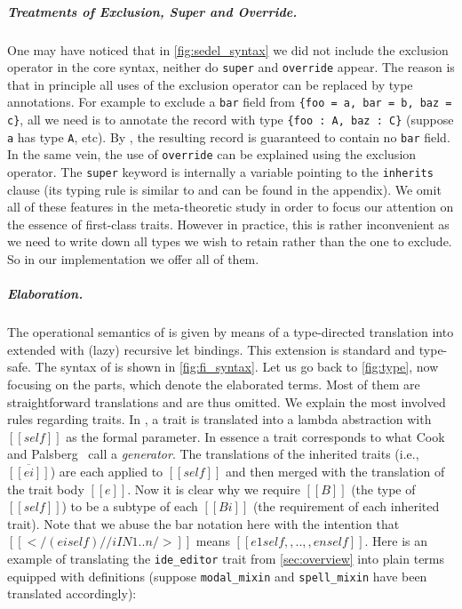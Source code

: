 \subparagraph{Treatments of Exclusion, Super and Override.}
One may have noticed that in \cref{fig:sedel_syntax} we did not include the
exclusion operator in the core \name syntax, neither do \lstinline{super} and
\lstinline{override} appear. The reason is that in principle all
uses of the exclusion operator can be replaced by type annotations. For example
to exclude a \lstinline{bar} field from \lstinline${foo = a, bar = b, baz = c}$,
all we need is to annotate the record with type \lstinline${foo : A, baz : C}$
(suppose \lstinline{a} has type \lstinline{A}, etc). By , the resulting
record is guaranteed to contain no \lstinline{bar} field. In the same vein,
the use of \lstinline{override} can be explained using the exclusion operator.
The \lstinline{super} keyword is internally a variable pointing to the \lstinline{inherits} clause
(its typing rule is similar to  and can be found in the appendix).
We omit all of these features in the meta-theoretic study in order to focus our attention on
the essence of first-class traits.
However in practice, this is rather inconvenient as we need to write down
all types we wish to retain rather than the one to exclude. So in our
implementation we offer all of them.

\subparagraph{Elaboration.}

The operational semantics of \name is given by means of a type-directed
translation into \bname extended with (lazy) recursive let bindings.
This extension is standard and type-safe. The syntax of \bname is shown in \cref{fig:fi_syntax}. Let us go back to
\cref{fig:type}, now focusing on the  parts, which
denote the elaborated \bname terms. Most of them
are straightforward translations and are thus omitted. We explain the most
involved rules regarding traits. In , a trait is translated into
a lambda abstraction with $[[self]]$ as the formal parameter.
In essence a trait corresponds to what Cook and Palsberg~\cite{cook1989denotational} call a \emph{generator}.
 The translations
of the inherited traits (i.e., $\overline{[[ei]]}$) are each applied to
$[[self]]$ and then merged with the translation of the trait body $[[e]]$. Now
it is clear why we require $[[B]]$ (the type of $[[self]]$) to be a subtype of each
$[[Bi]]$ (the requirement of each inherited trait). Note that we abuse the bar
notation here with the intention that $[[</ (ei self) // i IN 1..n />]]$ means
$[[e1 self ,, .. ,, en self]]$.
Here is an example of translating the \lstinline{ide_editor} trait from \cref{sec:overview} into
plain \bname terms equipped with definitions (suppose \lstinline{modal_mixin} and \lstinline{spell_mixin}
have been translated accordingly):


